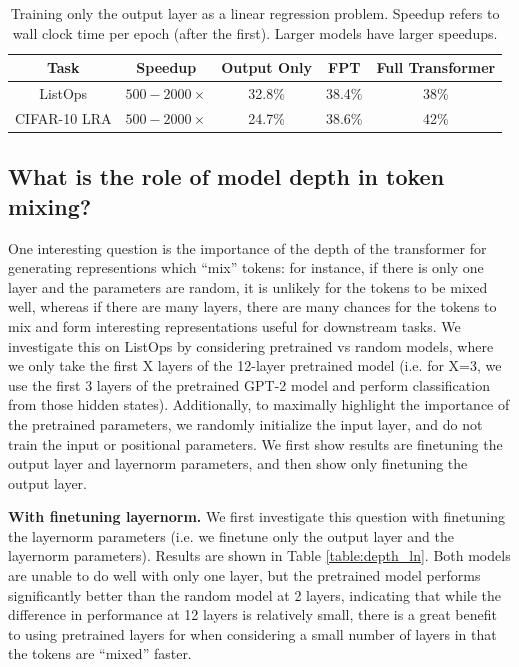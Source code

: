 \begin{table}[H]
\begin{center}
\begin{tabular}{c|c|ccc}
\toprule
\textbf{Task} & \textbf{Speedup} & \multicolumn{1}{c}{\bf Output Only} & \multicolumn{1}{c}{\bf FPT} & \multicolumn{1}{c}{\bf Full Transformer}  \\
\midrule
ListOps      & $500-2000\times$ & 32.8\% & 38.4\% & 38\% \\
CIFAR-10 LRA & $500-2000\times$ & 24.7\% & 38.6\% & 42\% \\
\bottomrule
\end{tabular}
\end{center}
\caption{Training only the output layer as a linear regression problem. Speedup refers to wall clock time per epoch (after the first). Larger models have larger speedups.}\label{table:linear}
\end{table}

\subsection{What is the role of model depth in token mixing?}
\label{sec:model_depth}

One interesting question is the importance of the depth of the transformer for generating representions which ``mix'' tokens: for instance, if there is only one layer and the parameters are random, it is unlikely for the tokens to be mixed well, whereas if there are many layers, there are many chances for the tokens to mix and form interesting representations useful for downstream tasks.
We investigate this on ListOps by considering pretrained vs random models, where we only take the first X layers of the 12-layer pretrained model (i.e. for X=3, we use the first 3 layers of the pretrained GPT-2 model and perform classification from those hidden states).
Additionally, to maximally highlight the importance of the pretrained parameters, we randomly initialize the input layer, and do not train the input or positional parameters.
We first show results are finetuning the output layer and layernorm parameters, and then show only finetuning the output layer.

\textbf{With finetuning layernorm.}
We first investigate this question with finetuning the layernorm parameters (i.e. we finetune only the output layer and the layernorm parameters).
Results are shown in Table \ref{table:depth_ln}.
Both models are unable to do well with only one layer, but the pretrained model performs significantly better than the random model at 2 layers, indicating that while the difference in performance at 12 layers is relatively small, there is a great benefit to using pretrained layers for when considering a small number of layers in that the tokens are ``mixed'' faster.

